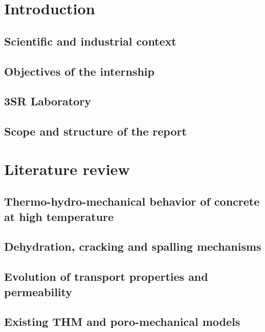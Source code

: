 \documentclass[twoside]{report}
\begin{document}

\cleardoublepage
\tableofcontents




\cleardoublepage
\chapter{Introduction}

\section{Scientific and industrial context}
\section{Objectives of the internship}
\section{3SR Laboratory}
\section{Scope and structure of the report}



\cleardoublepage
\chapter{Literature review}

\section{Thermo-hydro-mechanical behavior of concrete at high temperature}
\section{Dehydration, cracking and spalling mechanisms}
\section{Evolution of transport properties and permeability}
\section{Existing THM and poro-mechanical models}
\end{document}
